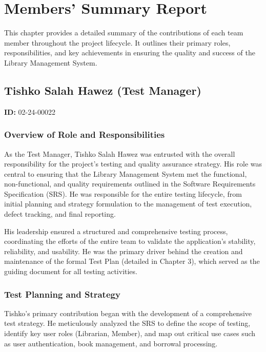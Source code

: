 \chapter{Members' Summary Report}
\label{chap:members_summary_report}

This chapter provides a detailed summary of the contributions of each team member throughout the project lifecycle. It outlines their primary roles, responsibilities, and key achievements in ensuring the quality and success of the Library Management System.

\section{Tishko Salah Hawez (Test Manager)}
\label{sec:tishko_salah_summary}
\textbf{ID:} 02-24-00022

\subsection{Overview of Role and Responsibilities}
As the Test Manager, Tishko Salah Hawez was entrusted with the overall responsibility for the project's testing and quality assurance strategy. His role was central to ensuring that the Library Management System met the functional, non-functional, and quality requirements outlined in the Software Requirements Specification (SRS). He was responsible for the entire testing lifecycle, from initial planning and strategy formulation to the management of test execution, defect tracking, and final reporting.

His leadership ensured a structured and comprehensive testing process, coordinating the efforts of the entire team to validate the application's stability, reliability, and usability. He was the primary driver behind the creation and maintenance of the formal Test Plan (detailed in Chapter 3), which served as the guiding document for all testing activities.

\subsection{Test Planning and Strategy}
Tishko's primary contribution began with the development of a comprehensive test strategy. He meticulously analyzed the SRS to define the scope of testing, identify key user roles (Librarian, Member), and map out critical use cases such as user authentication, book management, and borrowal processing.

